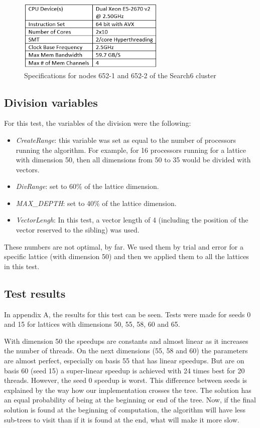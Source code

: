 \documentclass[conference]{IEEEtran}
\begin{document}
\begin{figure}[ht!]
\centering
\includegraphics[width=70mm]{TestesFinais/652Specs}
\caption{Specifications for nodes 652-1 and 652-2 of the Search6 cluster}
\end{figure}


\subsection{Division variables}
For this test, the variables of the division were the following:

\begin{itemize}
\item \emph{CreateRange}: this variable was set as equal to the number of processors running the algorithm. For example, for 16 processors running for a lattice with dimension 50, then all dimensions from 50 to 35 would be divided with vectors.
\item \emph{DivRange}: set to 60\% of the lattice dimension.
\item \emph{MAX\_DEPTH}: set to 40\% of the lattice dimension.
\item \emph{VectorLengh}: In this test, a vector length of 4 (including the position of the vector reserved to the sibling) was used.
\end{itemize}

These numbers are not optimal, by far. We used them by trial and error for a specific lattice (with dimension 50) and then we applied them to all the lattices in this test. 


\subsection{Test results}


In appendix A, the results for this test can be seen. Tests were made for seeds 0 and 15 for lattices with dimensions 50, 55, 58, 60 and 65. 

With dimension 50 the speedups are constants and almost linear as it increases the number of threads. On the next dimensions (55, 58 and 60) the parameters are almost perfect, especially on basis 55 that has linear speedups. But are on basis 60 (seed 15) a super-linear speedup is achieved with 24 times best for 20 threads. However, the seed 0 speedup is worst. This difference between seeds is explained by the way how our implementation crosses the tree. The solution has an equal probability of being at the beginning or end of the tree. Now, if the final solution is found at the beginning of computation, the algorithm will have less sub-trees to visit than if it is found at the end, what will make it more slow.
\end{document}
